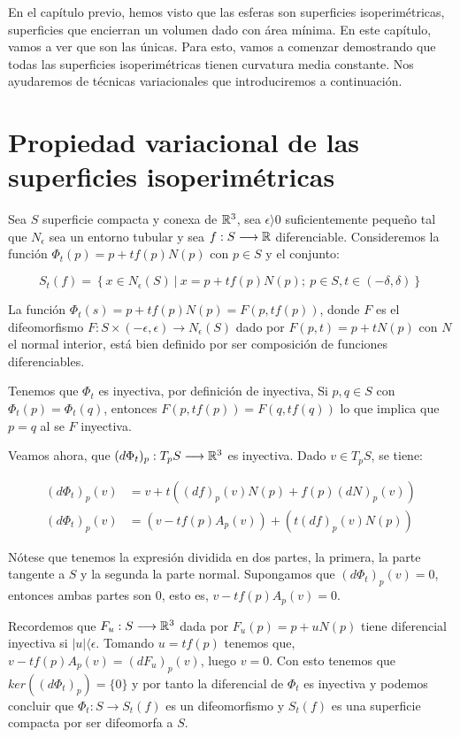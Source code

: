 En el capítulo previo, hemos visto que las esferas son superficies isoperimétricas, superficies que encierran un volumen dado con área mínima. En este capítulo, vamos a ver que son las únicas. Para esto, vamos a comenzar demostrando que todas las superficies isoperimétricas tienen curvatura media constante. Nos ayudaremos de técnicas variacionales que introduciremos a continuación.

\section{Propiedad variacional de las superficies isoperimétricas}

Sea $S$ superficie compacta y conexa de $\mathbb{R}^3$, sea $\epsilon  \rangle  0$ suficientemente pequeño tal que $N_\epsilon$ sea un entorno tubular y sea $f: S \longrightarrow \mathbb{R}$ diferenciable. Consideremos la función $\Phi_t(p) = p + tf(p)N(p)$ con $p \in S$ y el conjunto:

\begin{equation*}
    S_t(f) = \left\{ x \in N_\epsilon(S) \ | \ x = p + tf(p)N(p); \ p \in S, t \in (-\delta, \delta) \right\}
\end{equation*}

La función $\Phi_t(s) = p + tf(p)N(p) = F(p, tf(p))$, donde $F$ es el difeomorfismo $F: S \times (-\epsilon, \epsilon) \longrightarrow N_\epsilon(S)$ dado por $F(p,t) = p + tN(p)$ con $N$ el normal interior, está bien definido por ser composición de funciones diferenciables.

Tenemos que $\Phi_t$ es inyectiva, por definición de inyectiva, Si $p,q \in S$ con $\Phi_t(p) = \Phi_t(q)$, entonces $F(p, tf(p)) = F(q, tf(q))$ lo que implica que $p=q$ al se $F$ inyectiva.

Veamos ahora, que $(d\Phi_t)_p: T_pS \longrightarrow \mathbb{R}^3$ es inyectiva. Dado $v \in T_pS$, se tiene:

\begin{align*}
    (d\Phi_t)_p(v) &= v + t((df)_p(v)N(p) + f(p)(dN)_p(v)) \\
    (d\Phi_t)_p(v) &= (v - tf(p)A_p(v)) + (t(df)_p(v)N(p))
\end{align*}

Nótese que tenemos la expresión dividida en dos partes, la primera, la parte tangente a $S$ y la segunda la parte normal. Supongamos que $(d\Phi_t)_p(v) = 0$, entonces ambas partes son 0, esto es, $v - tf(p)A_p(v) = 0$.

Recordemos que $F_u: S \longrightarrow \mathbb{R}^3$ dada por $F_u(p) = p + uN(p)$ tiene diferencial inyectiva si $|u|  \langle  \epsilon$. Tomando $u=tf(p)$ tenemos que, $v - tf(p)A_p(v) = (dF_u)_p(v)$, luego $v=0$. Con esto tenemos que $ker((d\Phi_t)_p) = \{0\}$ y por tanto la diferencial de $\Phi_t$ es inyectiva y podemos concluir que $\Phi_t: S \longrightarrow S_t(f)$ es un difeomorfismo y $S_t(f)$ es una superficie compacta por ser difeomorfa a $S$.

